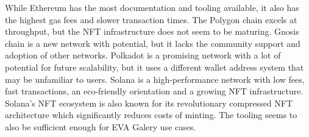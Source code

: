 \begin{table}[htb!]
\begin{tabular}{|l|l|l|l|l|l|l|l|}
    \end{tabular}
    \label{tab:networks}
    \end{table}


While Ethereum has the most documentation and tooling available, it also has the highest gas fees and slower transaction times. The Polygon chain excels at throughput, but the NFT infrastructure does not seem to be maturing. Gnosis chain is a new network with potential, but it lacks the community support and adoption of other networks. Polkadot is a promising network with a lot of potential for future scalability, but it uses a different wallet address system that may be unfamiliar to users. Solana is a high-performance network with low fees, fast transactions, an eco-friendly orientation and a growing NFT infrastructure. Solana's NFT ecosystem is also known for its revolutionary compressed NFT architecture which significantly reduces costs of minting. The tooling seems to also be sufficient enough for EVA Galery use cases. 

